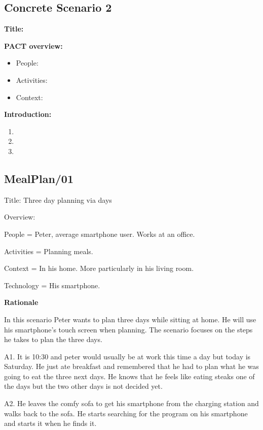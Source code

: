 \subsection{Concrete Scenario 2}\label{MealPlanCScenario02}

\textbf{Title:}

\textbf{PACT overview:}
\begin{itemize}
\item People: 
\item Activities:  
\item Context:
\end{itemize}

\textbf{Introduction:} 
\begin{enumerate}
\item 
\item
\item 
\end{enumerate}



\subsection{MealPlan/01} \label{MealPlan01}

Title: Three day planning via days

Overview: 

	People = Peter, average smartphone user. Works at an office.
	
	Activities = Planning meals.
	
	Context = In his home. More particularly in his living room.
	
	Technology = His smartphone.
	
\textbf{Rationale}

In this scenario Peter wants to plan three days while sitting at home. He will use his smartphone's touch screen when planning. The scenario focuses on the steps he takes to plan the three days.
	
	A1. It is 10:30 and peter would usually be at work this time a day but today is Saturday. He just ate breakfast and remembered that he had to plan what he was going to eat the three next days. He knows that he feels like eating steaks one of the days but the two other days is not decided yet.
	
	A2. He leaves the comfy sofa to get his smartphone from the charging station and walks back to the sofa. He starts searching for the program on his smartphone and starts it when he finds it.
	
